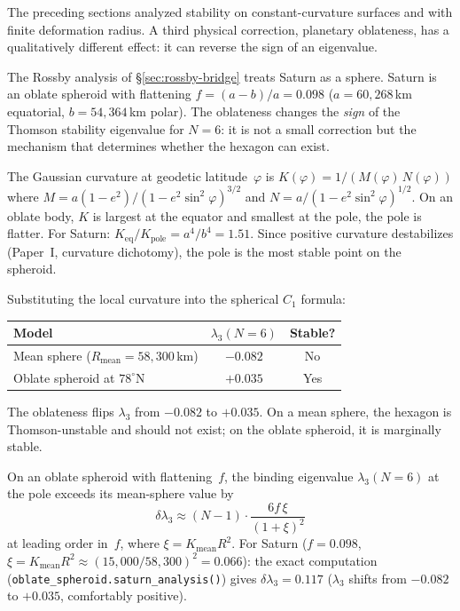 The preceding sections analyzed stability on
constant-curvature surfaces and with finite deformation
radius.  A third physical correction, planetary
oblateness, has a qualitatively different effect: it can
reverse the sign of an eigenvalue.

The Rossby analysis of \S\ref{sec:rossby-bridge} treats
Saturn as a sphere.
Saturn is an oblate spheroid with flattening
$f = (a{-}b)/a = 0.098$
($a = 60{,}268$\,km equatorial, $b = 54{,}364$\,km polar).
The oblateness changes the \emph{sign} of the Thomson stability
eigenvalue for $N = 6$: it is not a small correction but the
mechanism that determines whether the hexagon can exist.

The Gaussian curvature at geodetic latitude~$\varphi$ is
$K(\varphi) = 1/(M(\varphi)\,N(\varphi))$ where
$M = a(1{-}e^2)/(1{-}e^2\sin^2\!\varphi)^{3/2}$ and
$N = a/(1{-}e^2\sin^2\!\varphi)^{1/2}$.
On an oblate body, $K$ is largest at the equator and
smallest at the pole, the pole is flatter.
For Saturn: $K_{\mathrm{eq}}/K_{\mathrm{pole}} = a^4/b^4 = 1.51$.
Since positive curvature destabilizes
(Paper~I, curvature dichotomy), the pole is
the most stable point on the spheroid.

Substituting the local curvature into the spherical
$C_1$ formula:
\begin{center}
\begin{tabular}{lcc}
\toprule
Model & $\lambda_3(N{=}6)$ & Stable? \\
\midrule
Mean sphere ($R_{\mathrm{mean}} = 58{,}300$\,km) &
  $-0.082$ & No \\
Oblate spheroid at $78^\circ$N &
  $+0.035$ & Yes \\
\bottomrule
\end{tabular}
\end{center}
The oblateness flips $\lambda_3$ from $-0.082$ to $+0.035$.
On a mean sphere, the hexagon is Thomson-unstable and
should not exist; on the oblate spheroid, it is
marginally stable.

\begin{proposition}
\label{prop:oblateness}
On an oblate spheroid with flattening~$f$, the binding
eigenvalue $\lambda_3(N{=}6)$ at the pole exceeds its mean-sphere
value by
\begin{equation}\label{eq:oblateness-shift}
  \delta\lambda_3 \approx (N{-}1)\cdot
  \frac{6 f\,\xi}{(1{+}\xi)^2}
\end{equation}
at leading order in~$f$, where $\xi = K_{\mathrm{mean}} R^2$.
For Saturn ($f = 0.098$, $\xi = K_{\mathrm{mean}} R^2
\approx (15{,}000/58{,}300)^2 = 0.066$):
the exact computation
(\texttt{oblate\_spheroid.saturn\_analysis()})
gives $\delta\lambda_3 = 0.117$
($\lambda_3$ shifts from $-0.082$ to $+0.035$,
comfortably positive).
\end{proposition}

